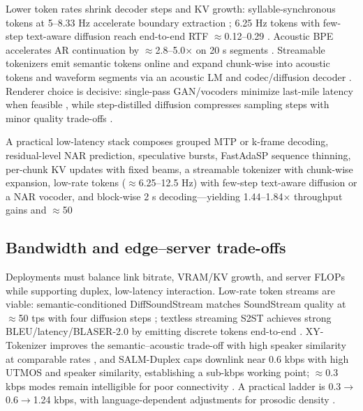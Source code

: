 \documentclass{article}
\begin{document}
Lower token rates shrink decoder steps and KV growth: syllable-synchronous tokens at 5--8.33 Hz accelerate boundary extraction \cite{baade2024syllablelmlearningcoarsesemanticunitsspe}; 6.25 Hz tokens with few-step text-aware diffusion reach end-to-end RTF $\approx$0.12--0.29 \cite{wang2025tadicodectextawarediffusionspeechtokeniz}. Acoustic BPE accelerates AR continuation by $\approx$2.8--5.0$\times$ on 20 s segments \cite{shen2024acousticbpespeechgenerationdiscretetoken}. Streamable tokenizers emit semantic tokens online and expand chunk-wise into acoustic tokens and waveform segments via an acoustic LM and codec/diffusion decoder \cite{turetzky2024lastlanguagemodelawarespeechtokenization,bai2025dmelspeechtokenizationmadesimple,yang2025diffsoundstreamefficientspeechtokenizati,vashishth2024stabspeechtokenizerassessmentbenchmark,zhao2024textlessstreamingspeechtranslationsemant}. Renderer choice is decisive: single-pass GAN/vocoders minimize last-mile latency when feasible \cite{wang2024evaluatingtextspeechsynthesislargediscre}, while step-distilled diffusion compresses sampling steps with minor quality trade-offs \cite{yang2025diffsoundstreamefficientspeechtokenizati}.

A practical low-latency stack composes grouped MTP or k-frame decoding, residual-level NAR prediction, speculative bursts, FastAdaSP sequence thinning, per-chunk KV updates with fixed beams, a streamable tokenizer with chunk-wise expansion, low-rate tokens ($\approx$6.25--12.5 Hz) with few-step text-aware diffusion or a NAR vocoder, and block-wise 2 s decoding---yielding 1.44--1.84$\times$ throughput gains and $\approx$50%

\subsection{Bandwidth and edge--server trade-offs} \label{subsec:bandwidthandedge--servertrade-offs}
Deployments must balance link bitrate, VRAM/KV growth, and server FLOPs while supporting duplex, low-latency interaction. Low-rate token streams are viable: semantic-conditioned DiffSoundStream matches SoundStream quality at $\approx$50 tps with four diffusion steps \cite{yang2025diffsoundstreamefficientspeechtokenizati}; textless streaming S2ST achieves strong BLEU/latency/BLASER-2.0 by emitting discrete tokens end-to-end \cite{zhao2024textlessstreamingspeechtranslationsemant}. XY-Tokenizer improves the semantic--acoustic trade-off with high speaker similarity at comparable rates \cite{gong2025xytokenizermitigatingsemanticacousticcon}, and SALM-Duplex caps downlink near 0.6 kbps with high UTMOS and speaker similarity, establishing a sub-kbps working point; $\approx$0.3 kbps modes remain intelligible for poor connectivity \cite{hu2025salmduplexefficientdirectmodelingspeechl,xue2025hhcodechighcompressionfidelitydiscretene}. A practical ladder is 0.3$\rightarrow$0.6$\rightarrow$1.24 kbps, with language-dependent adjustments for prosodic density \cite{onda2025benchmarkingprosodyencodingdiscretespeec,zhang2025impactframeratesspeechtokenizercasestudy}.
\end{document}
